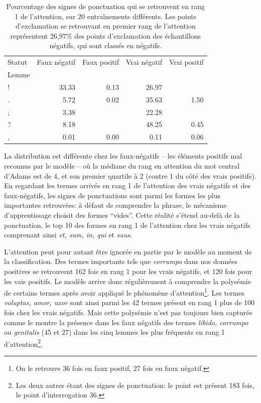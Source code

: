 \begin{table}[]
    \centering
    \begin{tabular}{l|rrrr}
    \toprule
    Statut &  Faux négatif & Faux positif &  Vrai négatif & Vrai positif \\
    Lemme &               &              &               &              \\
    \midrule
    !     &         33.33 &         0.13 &         26.97 &              \\
    .     &          5.72 &         0.02 &         35.63 &         1.50 \\
    ;     &          3.38 &              &         22.28 &              \\
    ?     &          8.18 &              &         48.25 &         0.45 \\
    ,     &          0.01 &         0.00 &          0.11 &         0.06 \\
    \bottomrule
    \end{tabular}
    \caption{Pourcentage des signes de ponctuation qui se retrouvent en rang 1 de l'attention, sur 20 entraînements différents. Les points d'exclamation se retrouvant en premier rang de l'attention représentent 26,97\% des points d'exclamation des échantillons négatifs, qui sont classés en négatifs.}
    \label{tab:chap4:ponctuation-attention}
\end{table}

La distribution est différente chez les faux-négatifs -- les éléments positifs mal reconnus par le modèle -- où la médiane du rang en attention du mot central d'Adams est de 4, et son premier quartile à 2 (contre 1 du côté des vrais positifs). En regardant les termes arrivés en rang 1 de l'attention des vrais négatifs et des faux-négatifs, les signes de ponctuations sont parmi les formes les plus importantes retrouvées: à défaut de comprendre la phrase, le mécanisme d'apprentissage choisit des formes ``vides''. Cette réalité s'étend au-delà de la ponctuation, le top 10 des formes en rang 1 de l'attention chez les vrais négatifs comprenant ainsi \textit{et, sum, in, qui} et \textit{suus}. 

L'attention peut pour autant être ignorée en partie par le modèle au moment de la classification. Des termes importants tels que \textit{corrumpo} dans nos données positives se retrouvent 162 fois en rang 1 pour les vrais négatifs, et 120 fois pour les vais positifs. Le modèle arrive donc régulièrement à comprendre la polysémie de certains termes après avoir appliqué le phénomène d'attention\footnote{On le retrouve 36 fois en faux positif, 27 fois en faux négatif.}. Les termes \textit{voluptas, amor, uxor} sont ainsi parmi les 42 termes présent en rang 1 plus de 100 fois chez les vrais négatifs. Mais cette polysémie n'est pas toujours bien capturée comme le montre la présence dans les faux négatifs des termes \textit{libido, corrumpo} ou \textit{genitalis} (45 et 27) dans les cinq lemmes les plus fréquents en rang 1 d'attention\footnote{Les deux autres étant des signes de ponctuation: le point est présent 183 fois, le point d'interrogation 36.}.

